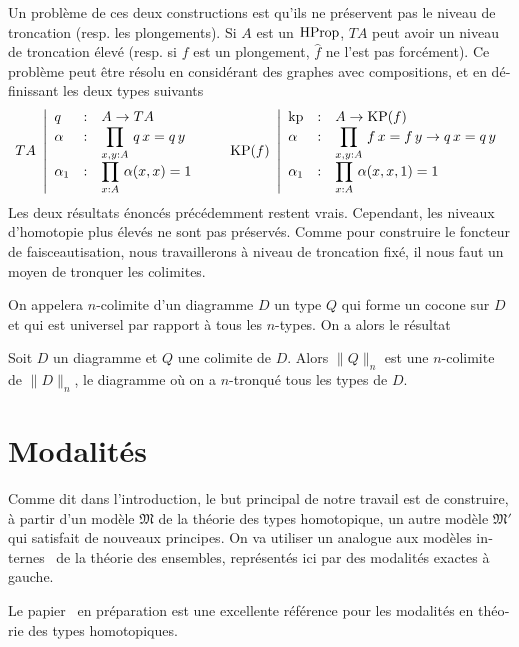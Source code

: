 \begin{otherlanguage}{french}
Un problème de ces deux constructions est qu'ils ne préservent pas le
niveau de troncation (resp. les plongements). Si $A$ est un $\operatorname{HProp}$,
$TA$ peut avoir un niveau de troncation élevé (resp. si $f$ est un
plongement, $\widehat f$ ne l'est pas forcément). Ce problème peut
être résolu en considérant des graphes avec compositions, et en
définissant les deux types suivants
\[
  TA~\left|
    \begin{array}{lll}
      q&:& A\to TA \\
      \alpha&:& \displaystyle{\prod_{x,y:A}\, q\, x = q\, y} \\
      \alpha_1&:& \displaystyle{\prod_{x:A}\, \alpha(x,x) = 1}
    \end{array}
  \right.
  \quad \quad
  \operatorname{KP}(f)~\left|
    \begin{array}{lll}
      \operatorname{kp}&:&A\to \operatorname{KP}(f) \\
      \alpha&:& \displaystyle{\prod_{x,y:A}\, f\, x = f\, y \to q\, x = q\, y} \\
      \alpha_1&:& \displaystyle{\prod_{x:A}\, \alpha(x,x,1) = 1}
    \end{array}    
  \right.
\]
Les deux résultats énoncés précédemment restent vrais. Cependant, les
niveaux d'homotopie plus élevés ne sont pas préservés.
Comme pour construire le foncteur de faisceautisation, nous travaillerons à
niveau de troncation fixé, il nous faut un moyen de tronquer les
colimites.

On appelera $n$-colimite d'un diagramme $D$ un type $Q$ qui forme un
cocone sur $D$ et qui est universel par rapport à tous les
$n$-types. On a alors le résultat
\begin{lemfr}
  Soit $D$ un diagramme et $Q$ une colimite de $D$. Alors $\|Q\|_n$
  est une $n$-colimite de $\|D\|_n$, le diagramme où on a $n$-tronqué
  tous les types de $D$.
\end{lemfr}

\section{Modalités}

Comme dit dans l'introduction, le but principal de notre travail est
de construire, à partir d'un modèle $\mathfrak M$ de la théorie des
types homotopique, un autre modèle $\mathfrak M'$ qui satisfait 
de nouveaux principes.
On va utiliser un analogue aux modèles internes~\cite{kunen} de la
théorie des ensembles, représentés ici par des modalités exactes à
gauche.

Le papier~\cite{RijkeShulmanSpitters} en préparation est une
excellente référence pour les modalités en théorie des types homotopiques.


\end{otherlanguage}
